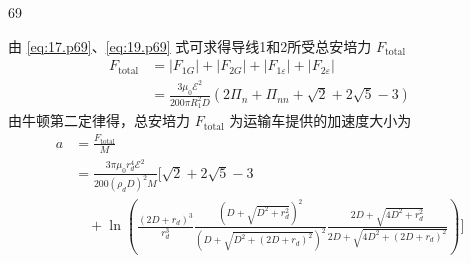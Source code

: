 \begin{solution}{69}
\begin{subsolution}
        由 \eqref{eq:17.p69}、\eqref{eq:19.p69} 式可求得导线1和2所受总安培力 $F_{\mathrm{total}}$ 
        \begin{align}
            F_{\mathrm{total}} &= |F_{1G}| + |F_{2G}| + |F_{1\varepsilon}| + |F_{2\varepsilon}| \nonumber \\
            &= \frac{3\mu_{0} \mathcal{E}^{2}}{200\pi R_{1}^{2} D} \left( 2\Pi_{n} + \Pi_{nn} + \sqrt{2} + 2\sqrt{5} - 3 \right)
        \end{align}
        由牛顿第二定律得，总安培力 $F_{\mathrm{total}}$ 为运输车提供的加速度大小为
        \begin{align}
            a &= \frac{F_{\mathrm{total}}}{M} \nonumber \\
            &= \frac{3\pi \mu_{0} r_{d}^{4} \mathcal{E}^{2}}{200(\rho_{d} D)^{2} M} \Bigg[ \sqrt{2} + 2\sqrt{5} - 3 \nonumber \\
            &\quad + \ln\left( \frac{(2D + r_{d})^{3}}{r_{d}^{3}} \frac{(D + \sqrt{D^{2} + r_{d}^{2}})^{2}}{(D + \sqrt{D^{2} + (2D + r_{d})^{2}})^{2}} \frac{2D + \sqrt{4D^{2} + r_{d}^{2}}}{2D + \sqrt{4D^{2} + (2D + r_{d})^{2}}} \right) \Bigg] \label{eq:20.p69}
        \end{align}
    \end{subsolution}
\end{solution}